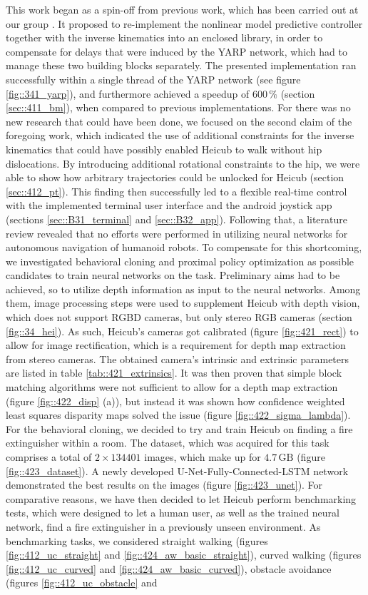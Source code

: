 \label{sec::5_co}
This work began as a spin-off from previous work, which has been carried out at our group \cite{stein2017closed}. It proposed to re-implement the nonlinear model predictive controller together with the inverse kinematics into an enclosed library, in order to compensate for delays that were induced by the YARP network, which had to manage these two building blocks separately. The presented implementation ran successfully within a single thread of the YARP network (see figure \ref{fig::341_yarp}), and furthermore achieved a speedup of $600\,\%$ (section \ref{sec::411_bm}), when compared to previous implementations. For there was no new research that could have been done, we focused on the second claim of the foregoing work, which indicated the use of additional constraints for the inverse kinematics that could have possibly enabled Heicub to walk without hip dislocations. By introducing additional rotational constraints to the hip, we were able to show how arbitrary trajectories could be unlocked for Heicub (section \ref{sec::412_pt}). This finding then successfully led to a flexible real-time control with the implemented terminal user interface and the android joystick app (sections \ref{sec::B31_terminal} and \ref{sec::B32_app}). Following that, a literature review revealed that no efforts were performed in utilizing neural networks for autonomous navigation of humanoid robots. To compensate for this shortcoming, we investigated behavioral cloning and proximal policy optimization as possible candidates to train neural networks on the task. Preliminary aims had to be achieved, so to utilize depth information as input to the neural networks. Among them, image processing steps were used to supplement Heicub with depth vision, which does not support RGBD cameras, but only stereo RGB cameras (section \ref{fig::34_hei}). As such, Heicub's cameras got calibrated (figure \ref{fig::421_rect}) to allow for image rectification, which is a requirement for depth map extraction from stereo cameras. The obtained camera's intrinsic and extrinsic parameters are listed in table \ref{tab::421_extrinsics}. It was then proven that simple block matching algorithms were not sufficient to allow for a depth map extraction (figure \ref{fig::422_disp} (a)), but instead it was shown how confidence weighted least squares disparity maps solved the issue (figure \ref{fig::422_sigma_lambda}). For the behavioral cloning, we decided to try and train Heicub on finding a fire extinguisher within a room. The dataset, which was acquired for this task comprises a total of $2\times134401$ images, which make up for $4.7\,\text{GB}$ (figure \ref{fig::423_dataset}). A newly developed U-Net-Fully-Connected-LSTM network demonstrated the best results on the images (figure \ref{fig::423_unet}). For comparative reasons, we have then decided to let Heicub perform benchmarking tests, which were designed to let a human user, as well as the trained neural network, find a fire extinguisher in a previously unseen environment. As benchmarking tasks, we considered straight walking (figures \ref{fig::412_uc_straight} and \ref{fig::424_aw_basic_straight}), curved walking (figures \ref{fig::412_uc_curved} and \ref{fig::424_aw_basic_curved}), obstacle avoidance (figures \ref{fig::412_uc_obstacle} and 